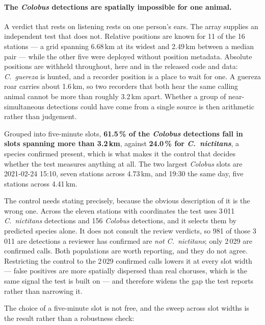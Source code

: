 \documentclass[review,3p,times]{elsarticle}
\begin{document}
\paragraph{The \textit{Colobus} detections are spatially impossible for one
animal.} A verdict that rests on listening rests on one person's ears. The array
supplies an independent test that does not. Relative positions are known for
11 of the 16 stations --- a grid spanning 6.68\,km at its widest and
2.49\,km between a median pair --- while the other five were deployed without
position metadata. Absolute positions are withheld throughout, here and in the
released code and data: \textit{C.\ guereza} is hunted, and a recorder position
is a place to wait for one. A guereza roar carries about 1.6\,km, so two recorders that both hear the
same calling animal cannot be more than roughly 3.2\,km apart. Whether a group
of near-simultaneous detections could have come from a single source is then
arithmetic rather than judgement.

Grouped into five-minute slots, \textbf{61.5\,\% of the \textit{Colobus}
detections fall in slots spanning more than 3.2\,km}, against \textbf{24.0\,\%
for \textit{C.\ nictitans}}, a species confirmed present, which is what makes it
the control that decides whether the test measures anything at all. The two
largest \textit{Colobus} slots are 2021-02-24 15:10, seven stations across
4.73\,km, and 19:30 the same day, five stations across 4.41\,km.

The control needs stating precisely, because the obvious description of it is
the wrong one. Across the eleven stations with coordinates the test uses 3\,011
\textit{C.\ nictitans} detections and 156 \textit{Colobus} detections, and it
selects them by predicted species alone. It does not consult the review
verdicts, so 981 of those 3\,011 are detections a reviewer has confirmed are
\emph{not} \textit{C.\ nictitans}; only 2\,029 are confirmed calls. Both
populations are worth reporting, and they do not agree. Restricting the control
to the 2\,029 confirmed calls lowers it at every slot width --- false positives
are more spatially dispersed than real choruses, which is the same signal the
test is built on --- and therefore widens the gap the test reports rather than
narrowing it.

The choice of a five-minute slot is not free, and the sweep across slot widths
is the result rather than a robustness check:
\end{document}
